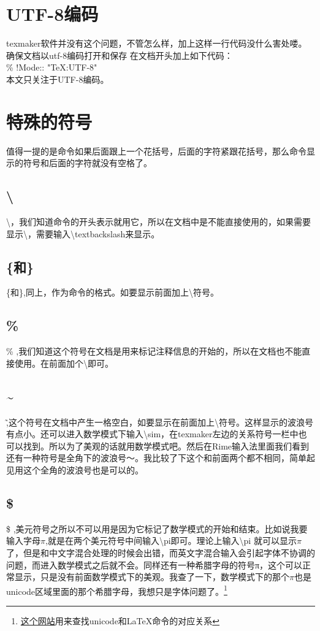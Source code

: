 \section{UTF-8编码}
texmaker软件并没有这个问题，不管怎么样，加上这样一行代码没什么害处喽。确保文档以utf-8编码打开和保存
在文档开头加上如下代码：\\
\% !Mode:: "TeX:UTF-8" \\
本文只关注于UTF-8编码。


\section{特殊的符号}
\label{sec:symbols}
值得一提的是命令如果后面跟上一个花括号，后面的字符紧跟花括号，那么命令显示的符号和后面的字符就没有空格了。
\subsection{\textbackslash}
\textbackslash ，我们知道命令的开头表示就用它，所以在文档中是不能直接使用的，如果需要显示\textbackslash ，需要输入\textbackslash textbackslash来显示。

\subsection{\{和\}}
\{和\},同上，作为命令的格式。如要显示前面加上\textbackslash 符号。

\subsection{\%}
\% ,我们知道这个符号在文档是用来标记注释信息的开始的，所以在文档也不能直接使用。在前面加个\textbackslash 即可。

\subsection{\~{}}
\~ ,这个符号在文档中产生一格空白，如要显示在前面加上\textbackslash 符号。这样显示的波浪号有点小。还可以进入数学模式下输入\textbackslash sim，在texmaker左边的关系符号一栏中也可以找到。所以为了美观的话就用数学模式吧。然后在Rime输入法里面我们看到还有一种符号是全角下的波浪号～。我比较了下这个和前面两个都不相同，简单起见用这个全角的波浪号也是可以的。

\subsection{\$}
\$ ,美元符号之所以不可以用是因为它标记了数学模式的开始和结束。比如说我要输入字母$\pi$,就是在两个美元符号中间输入\textbackslash pi即可。理论上输入\textbackslash pi 就可以显示$\pi$了，但是和中文字混合处理的时候会出错，而英文字混合输入会引起字体不协调的问题，而进入数学模式之后就不会。同样还有一种希腊字母的符号π，这个可以正常显示，只是没有前面数学模式下的美观。我查了一下，数学模式下的那个$\pi$也是unicode区域里面的那个希腊字母，我想只是字体问题了。\footnote{\href{http://www.johndcook.com/unicode_latex.html}{这个网站}用来查找unicode和\LaTeX 命令的对应关系}

